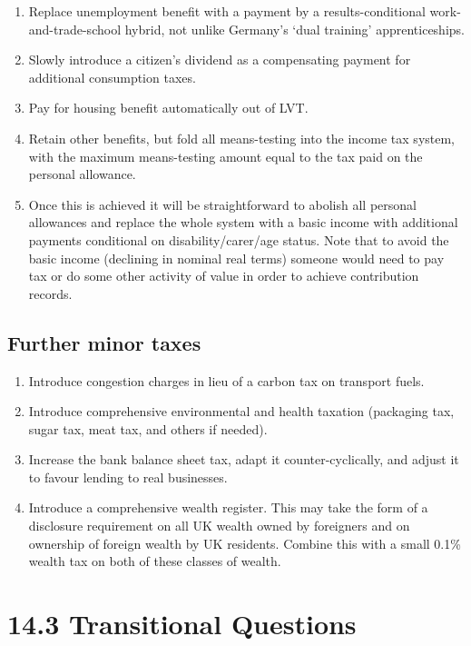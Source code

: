 \documentclass[]{tufte-handout}
\providecommand{\tightlist}{%
  \setlength{\itemsep}{0pt}\setlength{\parskip}{0pt}}
\begin{document}
\begin{enumerate}
\def\labelenumi{\arabic{enumi}.}
\tightlist
\item
  Replace unemployment benefit with a payment by a results-conditional
  work-and-trade-school hybrid, not unlike Germany's `dual training'
  apprenticeships.
\item
  Slowly introduce a citizen's dividend as a compensating payment for
  additional consumption taxes.
\item
  Pay for housing benefit automatically out of LVT.
\item
  Retain other benefits, but fold all means-testing into the income tax
  system, with the maximum means-testing amount equal to the tax paid on
  the personal allowance.
\item
  Once this is achieved it will be straightforward to abolish all
  personal allowances and replace the whole system with a basic income
  with additional payments conditional on disability/carer/age status.
  Note that to avoid the basic income (declining in nominal real terms)
  someone would need to pay tax or do some other activity of value in
  order to achieve contribution records.
\end{enumerate}

\hypertarget{further-minor-taxes}{%
\subsection{Further minor taxes}\label{further-minor-taxes}}

\begin{enumerate}
\def\labelenumi{\arabic{enumi}.}
\tightlist
\item
  Introduce congestion charges in lieu of a carbon tax on transport
  fuels.
\item
  Introduce comprehensive environmental and health taxation (packaging
  tax, sugar tax, meat tax, and others if needed).
\item
  Increase the bank balance sheet tax, adapt it counter-cyclically, and
  adjust it to favour lending to real businesses.
\item
  Introduce a comprehensive wealth register. This may take the form of a
  disclosure requirement on all UK wealth owned by foreigners and on
  ownership of foreign wealth by UK residents. Combine this with a small
  0.1\% wealth tax on both of these classes of wealth.
\end{enumerate}

\hypertarget{transitional-questions}{%
\section{14.3 Transitional Questions}\label{transitional-questions}}
\end{document}
